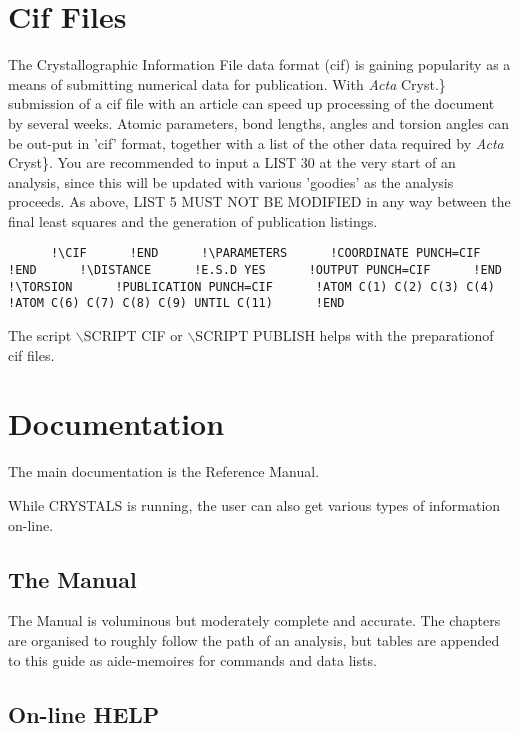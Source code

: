 \documentclass[10pt,a4paper]{report}
\begin{document}
\chapter{Cif Files}


The Crystallographic Information File data format (cif) is gaining popularity as a means of submitting numerical data for publication. With \emph{Acta} Cryst.\} submission of a cif file with an article can speed up processing of the document by several weeks. Atomic parameters, bond lengths, angles and torsion angles can be out-put in 'cif' format, together with a list of the other data required by \emph{Acta} Cryst\}. You are recommended to input a LIST 30 at the very start of an analysis, since this will be updated with various 'goodies' as the analysis proceeds. As above, LIST 5 MUST NOT BE MODIFIED in any way between the final least squares and the generation of publication listings.\small\begin{verbatim}      !\CIF      !END      !\PARAMETERS      !COORDINATE PUNCH=CIF      !END      !\DISTANCE      !E.S.D YES      !OUTPUT PUNCH=CIF      !END      !\TORSION      !PUBLICATION PUNCH=CIF      !ATOM C(1) C(2) C(3) C(4)      !ATOM C(6) C(7) C(8) C(9) UNTIL C(11)      !END\end{verbatim}\normalsize



The script $\backslash$SCRIPT CIF or $\backslash$SCRIPT PUBLISH helps with the preparationof cif files.

\chapter{Documentation}


The main documentation is the Reference Manual.

While CRYSTALS is running, the user can also get various types of information on-line.

\section{The Manual}


The Manual is voluminous but moderately complete and accurate. The
 chapters are organised to roughly follow the path of an analysis, but
 tables are appended to this guide as aide-memoires for commands and
 data lists.



\section{On-line HELP}
\end{document}
